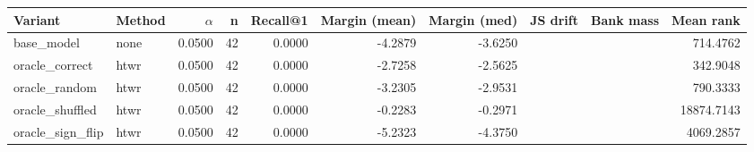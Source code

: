 \begin{tabular}{l l r r r r r r r r}
\toprule
Variant & Method & $\alpha$ & n & Recall@1 & Margin (mean) & Margin (med) & JS drift & Bank mass & Mean rank \\
\midrule
base\_model & none & 0.0500 & 42 & 0.0000 & -4.2879 & -3.6250 &  &  & 714.4762 \\
oracle\_correct & htwr & 0.0500 & 42 & 0.0000 & -2.7258 & -2.5625 &  &  & 342.9048 \\
oracle\_random & htwr & 0.0500 & 42 & 0.0000 & -3.2305 & -2.9531 &  &  & 790.3333 \\
oracle\_shuffled & htwr & 0.0500 & 42 & 0.0000 & -0.2283 & -0.2971 &  &  & 18874.7143 \\
oracle\_sign\_flip & htwr & 0.0500 & 42 & 0.0000 & -5.2323 & -4.3750 &  &  & 4069.2857 \\
\bottomrule
\end{tabular}
